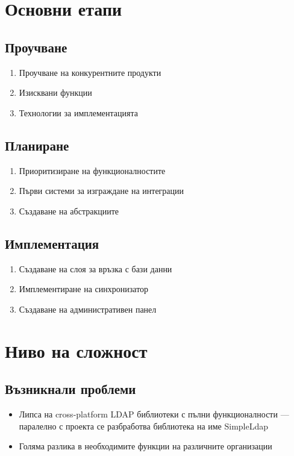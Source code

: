 \documentclass[bulgarian,a4paper,12pt,titlepage]{article}
\begin{document}
    \section{Основни етапи}
        \subsection{Проучване}
            \begin{enumerate}
                \item Проучване на конкурентните продукти
                \item Изисквани функции
                \item Технологии за имплементацията
            \end{enumerate}

        \subsection{Планиране}
            \begin{enumerate}
                \item Приоритизиране на функционалностите
                \item Първи системи за изграждане на интеграции
                \item Създаване на абстракциите
            \end{enumerate}
            
        \subsection{Имплементация}
            \begin{enumerate}
                \item Създаване на слоя за връзка с бази данни
                \item Имплементиране на синхронизатор
                \item Създаване на административен панел
            \end{enumerate}
            
    \section{Ниво на сложност}
        \subsection{Възникнали проблеми}
            \begin{itemize}
                \item Липса на cross-platform LDAP библиотеки с пълни функционалности --- паралелно с проекта се разбработва библиотека на име SimpleLdap
                \item Голяма разлика в необходимите функции на различните организации
            \end{itemize}
\end{document}
